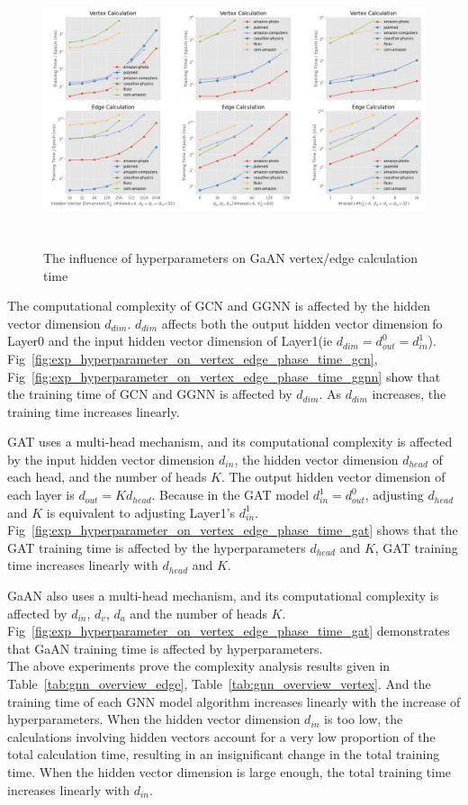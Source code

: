 \begin{figure}
	\centering
    \includegraphics[height=8cm]{figs/experiments/exp_hyperparameter_on_vertex_edge_phase_time_gaan.png}
    \caption{The influence of hyperparameters on GaAN vertex/edge calculation time}
	\label{fig:exp_hyperparameter_on_vertex_edge_phase_time_gaan}
\end{figure}

The computational complexity of GCN and GGNN is affected by the hidden vector dimension $d_{dim}$. $d_{dim}$ affects both the output hidden vector dimension fo Layer0 and
the input hidden vector dimension of Layer1(ie $d_{dim} = d^0_{out} = d^1_{in}$). Fig~\ref{fig:exp_hyperparameter_on_vertex_edge_phase_time_gcn}, Fig~\ref{fig:exp_hyperparameter_on_vertex_edge_phase_time_ggnn}
show that the training time of GCN and GGNN is affected by $d_{dim}$. As $d_{dim}$ increases, the training time increases linearly.

GAT uses a multi-head mechanism, and its computational complexity is affected by the input hidden vector dimension $d_{in}$, the hidden vector dimension $d_{head}$ of each head, and the number of heads $K$.
The output hidden vector dimension of each layer is $d_{out}=K d_{head}$.
Because in the GAT model $d^1_{in}=d^0_{out}$, adjusting $d_{head}$ and $K$ is equivalent to adjusting Layer1’s $d^1_{in}$.
Fig~\ref{fig:exp_hyperparameter_on_vertex_edge_phase_time_gat} shows that the GAT training time is affected by the hyperparameters $d_{head}$ and $K$, 
GAT training time increases linearly with $d_{head}$ and $K$.


GaAN also uses a multi-head mechanism, and its computational complexity is affected by $d_{in}$, $d_v$, $d_a$ and the number of heads $K$.
Fig~\ref{fig:exp_hyperparameter_on_vertex_edge_phase_time_gat} demonstrates that GaAN training time is affected by hyperparameters.
\\
The above experiments prove the complexity analysis results given in Table~\ref{tab:gnn_overview_edge}, Table~\ref{tab:gnn_overview_vertex}. 
And the training time of each GNN model algorithm increases linearly with the increase of hyperparameters.
When the hidden vector dimension $d_{in}$ is too low, the calculations involving hidden vectors account for a very low proportion of the total calculation time, resulting in an insignificant change in the total training time.
When the hidden vector dimension is large enough, the total training time increases linearly with $d_{in}$.


